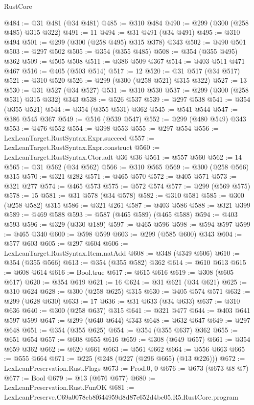 \begin{lexlean}{RustCore}
\begin{coremodule}
@484 := @31 @481 (@34 @481)
@485 := @310 @484
@490 := @299 (@300 (@258 @485) @315 @322)
@491 := 11
@494 := @31 @491 (@34 @491)
@495 := @310 @494
@501 := @299 (@300 (@258 @495) @315 @378) @343
@502 := @490 @501
@503 := @297 @502
@505 := @354 (@355 @485)
@508 := @354 (@355 @495) @362
@509 := @505 @508
@511 := @386 @509 @367
@514 := @403 @511 @471 @467
@516 := @405 (@503 @514)
@517 := 12
@520 := @31 @517 (@34 @517)
@521 := @310 @520
@526 := @299 (@300 (@258 @521) @315 @322)
@527 := 13
@530 := @31 @527 (@34 @527)
@531 := @310 @530
@537 := @299 (@300 (@258 @531) @315 @332) @343
@538 := @526 @537
@539 := @297 @538
@541 := @354 (@355 @521)
@544 := @354 (@355 @531) @362
@545 := @541 @544
@547 := @386 @545 @367
@549 := @516 (@539 @547)
@552 := @299 (@480 @549) @343
@553 := @476 @552
@554 := @398 @553
@555 := @297 @554
@556 := LexLeanTarget.RustSyntax.Expr.succeed
@557 := LexLeanTarget.RustSyntax.Expr.construct
@560 := LexLeanTarget.RustSyntax.Ctor.adt @36 @36
@561 := @557 @560
@562 := 14
@565 := @31 @562 (@34 @562)
@566 := @310 @565
@569 := @300 (@258 @566) @315
@570 := @321 @282
@571 := @465 @570
@572 := @405 @571
@573 := @321 @277
@574 := @465 @573
@575 := @572 @574
@577 := @299 (@569 @575)
@578 := 15
@581 := @31 @578 (@34 @578)
@582 := @310 @581
@585 := @300 (@258 @582) @315
@586 := @321 @261
@587 := @403 @586
@588 := @321 @399
@589 := @469 @588
@593 := @587 (@465 @589) (@465 @588)
@594 := @403 @593
@596 := @329 (@330 @189)
@597 := @465 @596
@598 := @594 @597
@599 := @465 @340
@600 := @598 @599
@603 := @299 (@585 @600) @343
@604 := @577 @603
@605 := @297 @604
@606 := LexLeanTarget.RustSyntax.Item.natAdd
@608 := @348 (@349 @606)
@610 := @354 (@355 @566)
@613 := @354 (@355 @582) @362
@614 := @610 @613
@615 := @608 @614
@616 := Bool.true
@617 := @615 @616
@619 := @308 (@605 @617)
@620 := @354 @619
@621 := 16
@624 := @31 @621 (@34 @621)
@625 := @310 @624
@628 := @300 (@258 @625) @315
@630 := @405 @574 @571
@632 := @299 (@628 @630)
@633 := 17
@636 := @31 @633 (@34 @633)
@637 := @310 @636
@640 := @300 (@258 @637) @315
@641 := @321 @477
@644 := @403 @641 @597 @599
@647 := @299 (@640 @644) @343
@648 := @632 @647
@649 := @297 @648
@651 := @354 (@355 @625)
@654 := @354 (@355 @637) @362
@655 := @651 @654
@657 := @608 @655 @616
@659 := @308 (@649 @657)
@661 := @354 @659 @362
@662 := @620 @661
@663 := @561 @662
@664 := @556 @663
@665 := @555 @664
@671 := @225 (@248 (@227 (@296 @665) (@13 @226)))
@672 := LexLeanPreservation.Rust.Flags
@673 := Prod.{0, 0}
@676 := @673 (@673 @8 @7)
@677 := Bool
@679 := @13 (@676 @677)
@680 := LexLeanPreservation.Rust.FunOK
@681 := LexLeanPreserve.C69a0078cb8f644959d8d87c652d4be05.R5.RustCore.program

\end{coremodule}
\end{lexlean}
